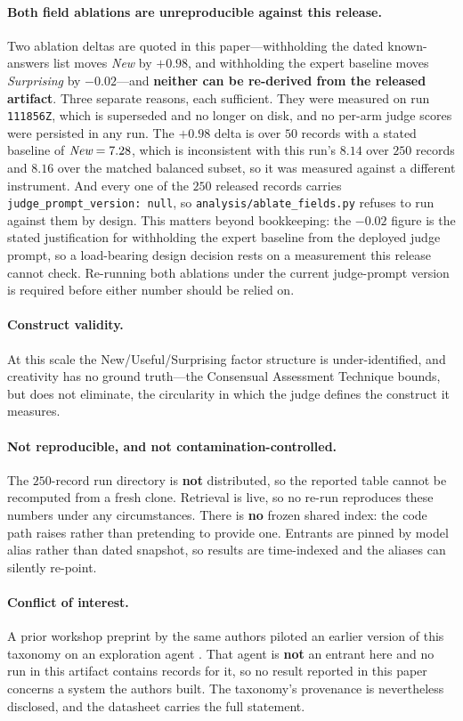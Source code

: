 \paragraph{Both field ablations are unreproducible against this release.} Two ablation deltas are
quoted in this paper---withholding the dated known-answers list moves \emph{New} by $+0.98$, and
withholding the expert baseline moves \emph{Surprising} by $-0.02$---and \textbf{neither can be
re-derived from the released artifact}. Three separate reasons, each sufficient. They were measured on
run \texttt{111856Z}, which is superseded and no longer on disk, and no per-arm judge scores were
persisted in any run. The $+0.98$ delta is over $50$ records with a stated baseline of $\emph{New} =
7.28$, which is inconsistent with this run's $8.14$ over $250$ records and $8.16$ over the matched
balanced subset, so it was measured against a different instrument. And every one of the $250$ released
records carries \texttt{judge\_prompt\_version: null}, so \texttt{analysis/ablate\_fields.py} refuses
to run against them by design. This matters beyond bookkeeping: the $-0.02$ figure is the stated
justification for withholding the expert baseline from the deployed judge prompt, so a load-bearing
design decision rests on a measurement this release cannot check. Re-running both ablations under the
current judge-prompt version is required before either number should be relied on.

\paragraph{Construct validity.} At this scale the New/Useful/Surprising factor structure is
under-identified, and creativity has no ground truth---the Consensual Assessment Technique bounds,
but does not eliminate, the circularity in which the judge defines the construct it measures.

\paragraph{Not reproducible, and not contamination-controlled.} The $250$-record run directory is
\textbf{not} distributed, so the reported table cannot be recomputed from a fresh clone. Retrieval
is live, so no re-run reproduces these numbers under any circumstances. There is \textbf{no} frozen
shared index: the code path raises rather than pretending to provide one. Entrants are pinned by
model alias rather than dated snapshot, so results are time-indexed and the aliases can silently
re-point.

\paragraph{Conflict of interest.} A prior workshop preprint by the same authors piloted an earlier
version of this taxonomy on an exploration agent \citep{caesar2026}. That agent is \textbf{not} an
entrant here and no run in this artifact contains records for it, so no result reported in this
paper concerns a system the authors built. The taxonomy's provenance is nevertheless disclosed, and
the datasheet carries the full statement.
